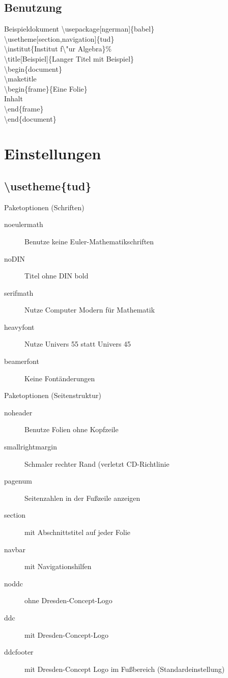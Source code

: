 \documentclass[presentation,t]{beamer}
\begin{document}
\subsection{Benutzung}
\label{sec-1-2}
\begin{frame}[label=sec-1-2-1]{Beispieldokument}
\textbackslash usepackage[ngerman]\{babel\}\\
\textbackslash usetheme[section,navigation]\{tud\}\\
\textbackslash institut\{Institut f\textbackslash "ur Algebra\}\%\\
\textbackslash title[Beispiel]\{Langer Titel mit Beispiel\}\\
\textbackslash begin\{document\}\\
\textbackslash maketitle\\
\textbackslash begin\{frame\}\{Eine Folie\}\\
Inhalt\\
\textbackslash end\{frame\}\\
\textbackslash end\{document\}\\
\end{frame}

\section{Einstellungen}
\label{sec-2}
\subsection{\textbackslash usetheme\{tud\}}
\label{sec-2-1}
\begin{frame}[label=sec-2-1-1]{Paketoptionen (Schriften)}
\begin{description}
\item[{noeulermath}] Benutze keine Euler-Mathematikschriften
\item[{noDIN}] Titel ohne DIN bold
\item[{serifmath}] Nutze Computer Modern für Mathematik
\item[{heavyfont}] Nutze Univers 55 statt Univers 45
\item[{beamerfont}] Keine Fontänderungen
\end{description}
\end{frame}
\begin{frame}[label=sec-2-1-2]{Paketoptionen (Seitenstruktur)}
\begin{description}
\item[{noheader}] Benutze Folien ohne Kopfzeile
\item[{smallrightmargin}] Schmaler rechter Rand (verletzt CD-Richtlinie
\item[{pagenum}] Seitenzahlen in der Fußzeile anzeigen
\item[{section}] mit Abschnittstitel auf jeder Folie
\item[{navbar}] mit Navigationshilfen
\item[{noddc}] ohne Dresden-Concept-Logo
\item[{ddc}] mit Dresden-Concept-Logo
\item[{ddcfooter}] mit Dresden-Concept Logo im Fußbereich (Standardeinstellung)
\end{description}
\end{frame}
\end{document}

